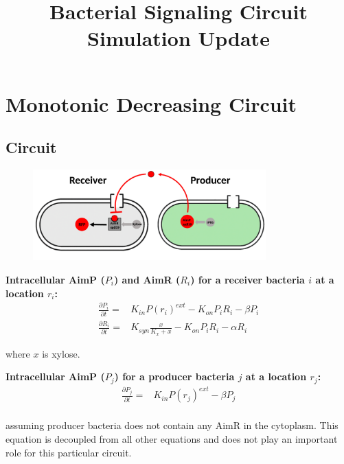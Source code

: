 \documentclass[11pt,a4paper]{article}
\title{Bacterial Signaling Circuit Simulation Update}
\author{} %
\begin{document}
\maketitle

\section{Monotonic Decreasing Circuit}

\subsection{Circuit}

\begin{figure}[H]
    \centering
    \includegraphics[width=0.8\textwidth]{../figures/diagramMonDec.png}
    \label{fig:mono_dec_schematic}
\end{figure}

\textbf{Intracellular AimP ($P_i$) and AimR ($R_i$) for a receiver bacteria $i$ at a location $r_i$:}
\begin{align*}
\frac{\partial P_i}{\partial t} =& K_{in} P(r_i)^{ext} - K_{on} P_i R_i - \beta P_i\\
\frac{\partial R_i}{\partial t} =& K_{syn} \frac{x}{K_x + x}  - K_{on} P_i R_i - \alpha R_i
\end{align*}

where $x$ is xylose.


\textbf{Intracellular AimP ($P_j$) for a producer bacteria $j$ at a location $r_j$:}
\begin{align*}
\frac{\partial P_j}{\partial t} =& K_{in} P(r_j)^{ext} - \beta P_j\\
\end{align*}

assuming producer bacteria does not contain any AimR in the cytoplasm. This equation is decoupled from all other equations and does not play an important role for this particular circuit.
\end{document}
